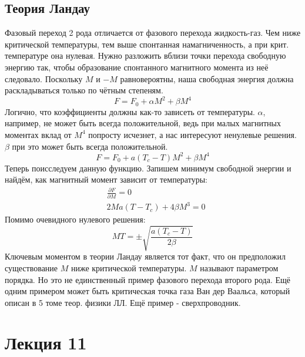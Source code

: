 \documentclass[a4paper, 12pt]{article}
\begin{document}
	\subsection{Теория Ландау}
	Фазовый переход 2 рода отличается от фазового перехода жидкость-газ. Чем ниже критической температуры, тем выше спонтанная намагниченность, а при крит. температуре она нулевая. Нужно разложить вблизи точки перехода свободную энергию так, чтобы образование спонтанного магнитного момента из неё следовало. Поскольку $M$ и $-M$ равновероятны, наша свободная энергия должна раскладываться только по чётным степеням.
	\begin{equation*}
		F = F_{0} + \alpha M^{2} + \beta M^{4}
	\end{equation*}
	Логично, что коэффициенты должны как-то зависеть от температуры. $\alpha$, например, не может быть всегда положительной, ведь при малых магнитных моментах вклад от $M^{4}$ попросту исчезнет, а нас интересуют ненулевые решения.  $\beta$ при это может быть всегда положительной.
	\begin{equation*}
		F = F_{0} + a (T_{c} - T) M^{2} + \beta M^{4}
	\end{equation*}
	Теперь поисследуем данную функцию. Запишем минимум свободной энергии и найдём, как магнитный момент зависит от температуры:
	\begin{equation*}
		\begin{aligned}
			& \frac{\partial F}{\partial M} = 0 \\
			& 2Ma(T-T_{c}) + 4 \beta M^{3} = 0  
		\end{aligned}
	\end{equation*}
	Помимо очевидного нулевого решения:
	\begin{equation*}
		MT = \pm \sqrt{\frac{a(T_{c} - T)}{2 \beta}}	
	\end{equation*}
	Ключевым моментом в теории Ландау является тот факт, что он предположил существование $M$ ниже критической температуры. $M$ называют параметром порядка. Но это не единственный пример фазового перехода второго рода. Ещё одним примером может быть критическая точка газа Ван дер Ваальса, который описан в 5 томе теор. физики ЛЛ. Ещё пример - сверхпроводник.
	\section{Лекция 11}
\end{document}
